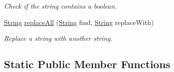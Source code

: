 \begin{DoxyCompactItemize}
\begin{DoxyCompactList}\small\item\em Check if the string contains a boolean. \end{DoxyCompactList}\item 
\hyperlink{class_rad_j_a_v_1_1_string}{String} \hyperlink{class_rad_j_a_v_1_1_string_a8631dd8fc8ed789ab959315f7e73ddb4}{replace\+All} (\hyperlink{class_rad_j_a_v_1_1_string}{String} find, \hyperlink{class_rad_j_a_v_1_1_string}{String} replace\+With)
\begin{DoxyCompactList}\small\item\em Replace a string with another string. \end{DoxyCompactList}\end{DoxyCompactItemize}
\subsection*{Static Public Member Functions}
